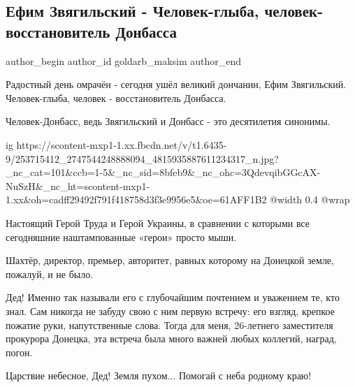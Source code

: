  
 
 
 
 
 
\subsection{Ефим Звягильский - Человек-глыба, человек-восстановитель Донбасса}
\label{sec:06_11_2021.fb.goldarb_maksim.1.zvjagilskij_smert}
 
\ifcmt
 author_begin
   author_id goldarb_maksim
 author_end
\fi

Радостный день омрачён - сегодня ушёл великий дончанин, Ефим Звягильский.
Человек-глыба, человек - восстановитель Донбасса. 

Человек-Донбасс, ведь Звягильский и Донбасс - это десятилетия синонимы. 

\ifcmt
  ig https://scontent-mxp1-1.xx.fbcdn.net/v/t1.6435-9/253715412_2747544248888094_4815935887611234317_n.jpg?_nc_cat=101&ccb=1-5&_nc_sid=8bfeb9&_nc_ohc=3QdevqibGGcAX-NuSzH&_nc_ht=scontent-mxp1-1.xx&oh=cadff29492f791f418758d3f3e9956e5&oe=61AFF1B2
  @width 0.4
  @wrap 
\fi

Настоящий Герой Труда и Герой Украины, в сравнении с которыми все сегодняшние
наштампованные «герои» просто мыши. 

Шахтёр, директор, премьер, авторитет, равных которому на Донецкой земле,
пожалуй, и не было. 

Дед! Именно так называли его с глубочайшим почтением и уважением те, кто знал.
Сам никогда не забуду свою с ним первую встречу: его взгляд, крепкое пожатие
руки, напутственные слова. Тогда для меня, 26-летнего заместителя прокурора
Донецка, эта встреча была много важней любых коллегий, наград, погон. 

Царствие небесное, Дед! Земля пухом... Помогай с неба родному краю!
